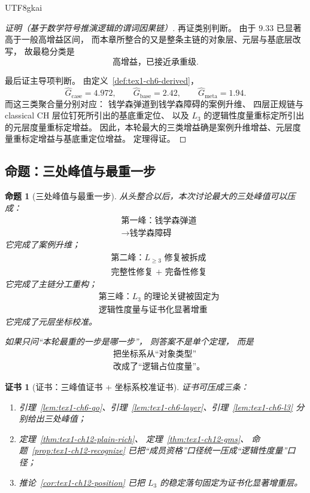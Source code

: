 \documentclass[12pt]{article}
\newtheorem{proposition}{命题}[section]
\newtheorem{Certificate}{证书}[section]
\begin{document}
\begin{CJK*}{UTF8}{gkai}
\begin{proof}[证明（基于数学符号推演逻辑的谓词因果链）]
再证类别判断。
由于 \(9.33\) 已显著高于一般高增益区间，
而本章所整合的又是整条主链的对象层、元层与基底层改写，
故最稳分类是
\[
  \text{高增益，已接近承重级}.
\]

最后证主导项判断。
由定义~\ref{def:tex1-ch6-derived}，
\[
  \widehat G_{\mathrm{case}}=4.972,\qquad
  \widehat G_{\mathrm{base}}=2.42,\qquad
  \widehat G_{\mathrm{meta}}=1.94.
\]
而这三类聚合量分别对应：
钱学森弹道到钱学森障碍的案例升维、
四层正规链与 classical CH 层位钉死所引出的基底重定位、
以及 \(L_3\) 的逻辑性度量重标定所引出的元层度量重标定增益。
因此，本轮最大的三类增益确是案例升维增益、元层度量重标定增益与基底重定位增益。
定理得证。
\end{proof}

\subsection{命题：三处峰值与最重一步}
\label{subsec:tex1-ch6-proposition}

\begin{proposition}[三处峰值与最重一步]
\label{prop:tex1-ch6-bialg}
从头整合以后，本次讨论最大的三处峰值可以压成：
\[
  \boxed{
    \begin{aligned}
      &\text{第一峰：钱学森弹道}\\
      &\to\text{钱学森障碍}
    \end{aligned}}
\]
它完成了案例升维；
\[
  \boxed{
    \begin{aligned}
      &\text{第二峰：}L_{\ge 3}\text{ 修复被拆成}\\
      &\text{完整性修复 + 完备性修复}
    \end{aligned}}
\]
它完成了主链分工重构；
\[
  \boxed{
    \begin{aligned}
      &\text{第三峰：}L_3\text{ 的理论关键被固定为}\\
      &\text{逻辑性度量与证书化显著增重}
    \end{aligned}}
\]
它完成了元层坐标校准。

如果只问“本轮最重的一步是哪一步”，
则答案不是单个定理，
而是
\[
  \boxed{
    \begin{aligned}
      &\text{把坐标系从“对象类型”}\\
      &\text{改成了“逻辑占位度量”。}
    \end{aligned}}
\]
\end{proposition}

\begin{Certificate}[证书：三峰值证书 + 坐标系校准证书]
\label{cert:tex1-ch6-derived}
证书可压成三条：
\begin{enumerate}
  \item 引理~\ref{lem:tex1-ch6-qo}、引理~\ref{lem:tex1-ch6-layer}、引理~\ref{lem:tex1-ch6-l3}
  分别给出三处峰值；
  \item 定理~\ref{thm:tex1-ch12-plain-rich}、
  定理~\ref{thm:tex1-ch12-gms}、
  命题~\ref{prop:tex1-ch12-recognize}
  已把“成员资格”口径统一压成“逻辑性度量”口径；
  \item 推论~\ref{cor:tex1-ch12-position} 已把 \(L_3\) 的稳定落句固定为证书化显著增重层。
\end{enumerate}
\end{Certificate}


\end{CJK*}
\end{document}
